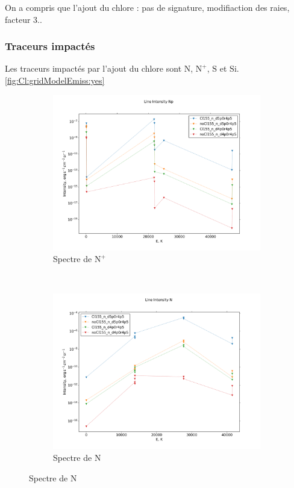 On a compris que l'ajout du chlore : pas de signature, modifiaction des raies, facteur 3..

\subsubsection{Traceurs impactés}

Les traceurs impactés par l'ajout du chlore sont $\mathrm{N}$, $\mathrm{N}^+$, $\mathrm{S}$ et $\mathrm{Si}$. \autoref{fig:Cl:gridModelEmiss:yes}


\begin{figure}[!htbp]
    \centering
    \begin{subfigure}[t]{0.45\textwidth} %
        \centering \includegraphics[trim = {0 0 0 1.5cm},clip,width=1\textwidth]{figure/Cl/gridModelEmiss/I_comp_Np.png}
        \caption{Spectre de $\mathrm{N}^+$}
    \end{subfigure}
    ~ 
   \begin{subfigure}[t]{0.45\textwidth} %
        \centering \includegraphics[trim = {0 0 0 1.5cm},clip,width=1\textwidth]{figure/Cl/gridModelEmiss/I_comp_N.png}
        \caption{Spectre de $\mathrm{N}$}
    \end{subfigure}
    

\end{figure}

